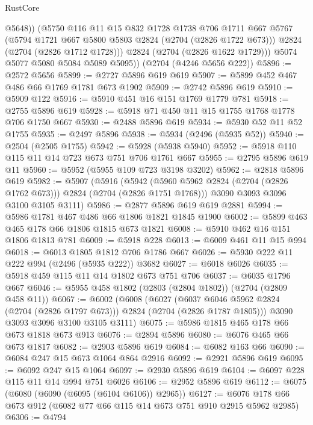 \begin{lexlean}{RustCore}
\begin{coremodule}
              @5648))
          (@5750
            @116
            @11
            @15
            @832
            @1728
            @1738
            @706
            @1711
            @667
            @5767
            (@5794 @1721 @667 @5800 @5803 @2824 (@2704 (@2826 @1722 @673)))
            @2824
            (@2704 (@2826 @1712 @1728)))
          @2824
          (@2704 (@2826 @1622 @1729)))
        @5074
        @5077
        @5080
        @5084
        @5089
        @5095))
    (@2704 (@4246 @5656 @222))
@5896 := @2572 @5656
@5899 := @2727 @5896 @619 @619
@5907 := @5899 @452 @467 @486 @66 @1769 @1781 @673 @1902
@5909 := @2742 @5896 @619
@5910 := @5909 @122
@5916 := @5910 @451 @16 @151 @1769 @1779 @781
@5918 := @2755 @5896 @619
@5928 := @5918 @71 @450 @11 @15 @1755 @1768 @1778 @706 @1750 @667
@5930 := @2488 @5896 @619
@5934 := @5930 @52 @11 @52 @1755
@5935 := @2497 @5896
@5938 := @5934 (@2496 (@5935 @52))
@5940 := @2504 (@2505 @1755)
@5942 := @5928 (@5938 @5940)
@5952 := @5918 @110 @115 @11 @14 @723 @673 @751 @706 @1761 @667
@5955 := @2795 @5896 @619 @11
@5960 := @5952 (@5955 @109 @723 @3198 @3202)
@5962 := @2818 @5896 @619
@5982 := @5907
    (@5916
      (@5942 (@5960 @5962 @2824 (@2704 (@2826 @1762 @673))) @2824 (@2704 (@2826 @1751 @1768)))
      @3090
      @3093
      @3096
      @3100
      @3105
      @3111)
@5986 := @2877 @5896 @619 @619 @2881
@5994 := @5986 @1781 @467 @486 @66 @1806 @1821 @1845 @1900
@6002 := @5899 @463 @465 @178 @66 @1806 @1815 @673 @1821
@6008 := @5910 @462 @16 @151 @1806 @1813 @781
@6009 := @5918 @228
@6013 := @6009 @461 @11 @15 @994
@6018 := @6013 @1805 @1812 @706 @1786 @667
@6026 := @5930 @222 @11 @222 @994 (@2496 (@5935 @222)) @3682
@6027 := @6018 @6026
@6035 := @5918 @459 @115 @11 @14 @1802 @673 @751 @706
@6037 := @6035 @1796 @667
@6046 := @5955 @458 @1802 (@2803 (@2804 @1802)) (@2704 (@2809 @458 @11))
@6067 := @6002
    (@6008
      (@6027 (@6037 @6046 @5962 @2824 (@2704 (@2826 @1797 @673))) @2824 (@2704 (@2826 @1787 @1805)))
      @3090
      @3093
      @3096
      @3100
      @3105
      @3111)
@6075 := @5986 @1815 @465 @178 @66 @673 @1818 @673 @913
@6076 := @2894 @5896
@6080 := @6076 @465 @66 @673 @1817
@6082 := @2903 @5896 @619
@6084 := @6082 @163 @66
@6090 := @6084 @247 @15 @673 @1064 @864 @2916
@6092 := @2921 @5896 @619
@6095 := @6092 @247 @15 @1064
@6097 := @2930 @5896 @619
@6104 := @6097 @228 @115 @11 @14 @994 @751 @6026
@6106 := @2952 @5896 @619
@6112 := @6075 (@6080 (@6090 (@6095 (@6104 @6106)) @2965))
@6127 := @6076 @178 @66 @673 @912 (@6082 @77 @66 @115 @14 @673 @751 @910 @2915 @5962 @2985)
@6306 := @4794

\end{coremodule}
\end{lexlean}
